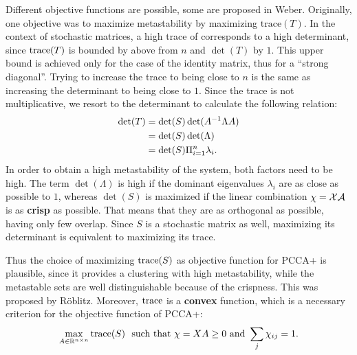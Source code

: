 Different objective functions are possible, some are proposed in Weber\cite[Chapter 3.4]{weber2006meshless}.
Originally, one objective was to maximize metastability by maximizing $\mathrm{trace}(T)$.
In the context of stochastic matrices, a high trace of corresponds to a high determinant, since $\mathrm{trace}(T)$ is bounded by above from $n$ and $\det(T)$ by $1$.
This upper bound is achieved only for the case of the identity matrix, thus for a ``strong diagonal''.
Trying to increase the trace to being close to $n$ is the same as increasing the determinant to being close to $1$.
Since the trace is not multiplicative, we resort to the determinant to calculate the following relation:
\begin{align*}
\det(T) & = \det(S) \det(A^{-1} \Lambda A)  \\
		  & = \det(S) \det(\Lambda)			 \\
          & = \det(S) \Pi_{i=1}^n \lambda_i.
\end{align*}
In order to obtain a high metastability of the system, both factors need to be high.
The term $\det(\Lambda)$ is high if the dominant eigenvalues $\lambda_i$ are as close as possible to $1$, whereas $\det(S)$ is maximized if the linear combination $\chi = \mathcal{X} \mathcal{A}$ is as \textbf{crisp} as possible.
That means that they are as orthogonal as possible, having only few overlap.
Since $S$ is a stochastic matrix as well, maximizing its determinant is equivalent to maximizing its trace.

Thus the choice of maximizing $\mathrm{trace}(S)$ as objective function for PCCA+ is plausible, since it provides a clustering with high metastability, while the metastable sets are well distinguishable because of the crispness.  This was proposed by R\"oblitz\cite{roblitz2009statistical}.
Moreover, $\mathrm{trace}$ is a \textbf{convex} function, which is a necessary criterion for the objective function of PCCA+:
\begin{equation}
\label{eq:crispness}
\max_{A \in \mathbb{R}^{n \times n}} \mathrm{trace}(S) \ \ \textrm{such that} \ \chi = XA \geq 0 \ \mathrm{and} \ \sum_j \chi_{ij} = 1. 
\end{equation}


